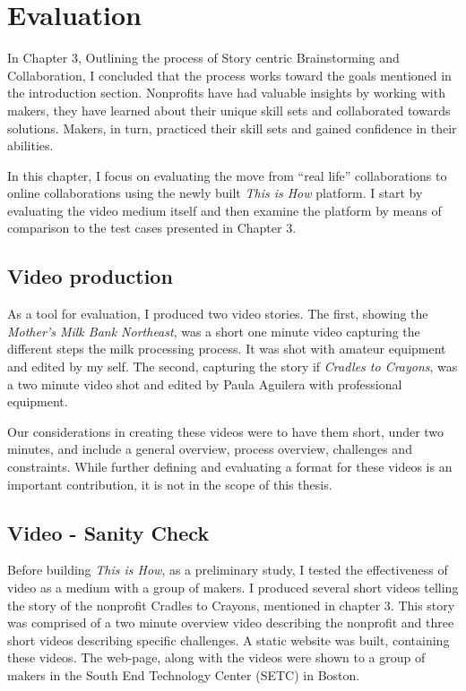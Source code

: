 \chapter{Evaluation}
\label{chap_eval}

In Chapter 3, Outlining the process of Story centric Brainstorming and Collaboration, I concluded that the process works toward the goals mentioned in the introduction section. Nonprofits have had valuable insights by working with makers, they have learned about their unique skill sets and collaborated towards solutions. Makers, in turn, practiced their skill sets and gained confidence in their abilities.

In this chapter, I focus on evaluating the move from ``real life'' collaborations to online collaborations using the newly built \textit{This is How} platform. I start by evaluating the video medium itself and then examine the platform by means of comparison to the test cases presented in Chapter 3.

\section{Video production} As a tool for evaluation, I produced two video stories. The first, showing the \textit{Mother's Milk Bank Northeast}, was a short one minute video capturing the different steps the milk processing process. It was shot with amateur equipment and edited by my self. The second, capturing the story if \textit{Cradles to Crayons}, was a two minute video shot and edited by Paula Aguilera\cite{paula} with professional equipment.

Our considerations in creating these videos were to have them short, under two minutes, and include a general overview, process overview, challenges and constraints. While further defining and evaluating a format for these videos is an important contribution, it is not in the scope of this thesis.

\section {Video - Sanity Check}

Before building \textit{This is How}, as a preliminary study, I tested the effectiveness of video as a medium with a group of makers. I produced several short videos telling the story of the nonprofit Cradles to Crayons, mentioned in chapter 3. This story was comprised of a two minute overview video describing the nonprofit and three short videos describing specific challenges. A static website was built, containing these videos. The web-page, along with the videos were shown to a group of makers in the South End Technology Center (SETC) in Boston.

